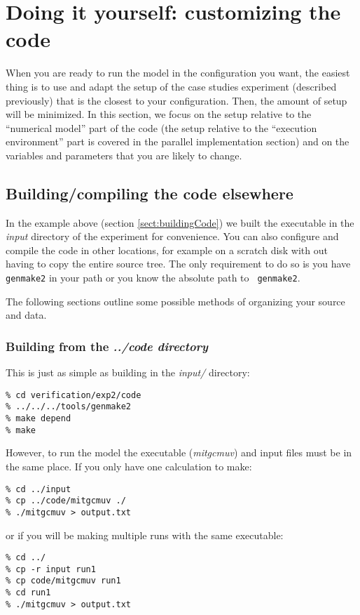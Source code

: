 \section[Customizing MITgcm]{Doing it yourself: customizing the code}

When you are ready to run the model in the configuration you want, the
easiest thing is to use and adapt the setup of the case studies
experiment (described previously) that is the closest to your
configuration. Then, the amount of setup will be minimized. In this
section, we focus on the setup relative to the ``numerical model''
part of the code (the setup relative to the ``execution environment''
part is covered in the parallel implementation section) and on the
variables and parameters that you are likely to change.


\subsection{Building/compiling the code elsewhere}

In the example above (section \ref{sect:buildingCode}) we built the
executable in the {\em input} directory of the experiment for
convenience. You can also configure and compile the code in other
locations, for example on a scratch disk with out having to copy the
entire source tree. The only requirement to do so is you have {\tt
  genmake2} in your path or you know the absolute path to {\tt
  genmake2}.

The following sections outline some possible methods of organizing
your source and data.

\subsubsection{Building from the {\em ../code directory}}

This is just as simple as building in the {\em input/} directory:
\begin{verbatim}
% cd verification/exp2/code
% ../../../tools/genmake2
% make depend
% make
\end{verbatim}
However, to run the model the executable ({\em mitgcmuv}) and input
files must be in the same place. If you only have one calculation to make:
\begin{verbatim}
% cd ../input
% cp ../code/mitgcmuv ./
% ./mitgcmuv > output.txt
\end{verbatim}
or if you will be making multiple runs with the same executable:
\begin{verbatim}
% cd ../
% cp -r input run1
% cp code/mitgcmuv run1
% cd run1
% ./mitgcmuv > output.txt
\end{verbatim}

